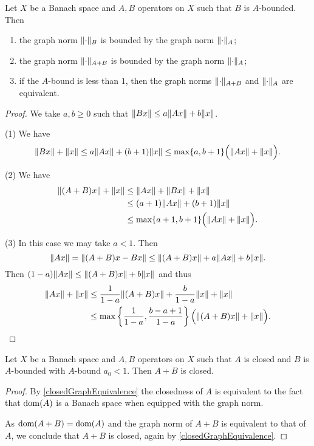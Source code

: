 \begin{lemma}
Let $X$ be a Banach space and $A,B$ operators on $X$ such that $B$ is $A$-bounded. Then
\begin{enumerate}
\item the graph norm $\lVert\cdot\rVert_B$ is bounded by the graph norm $\lVert\cdot\rVert_{A}$;
\item the graph norm $\lVert\cdot\rVert_{A+B}$ is bounded by the graph norm $\lVert\cdot\rVert_{A}$;
\item if the $A$-bound is less than $1$, then the graph norms $\lVert\cdot\rVert_{A+B}$ and $\lVert\cdot\rVert_{A}$ are equivalent.
\end{enumerate}
\end{lemma}
\begin{proof}
We take $a,b\geq 0$ such that $\lVert Bx\rVert \leq a\lVert Ax\rVert + b\lVert x\rVert$.

(1) We have
\[ \lVert Bx\rVert+\lVert x\rVert \leq a\lVert Ax\rVert + (b+1)\lVert x\rVert \leq \max\{a,b+1\}\Big(\lVert Ax\rVert +\lVert x\rVert\Big). \]

(2) We have
\begin{align*}
\lVert(A+B)x\rVert + \lVert x\rVert &\leq \lVert Ax\rVert +\lVert Bx\rVert +\lVert x\rVert \\
&\leq (a+1)\lVert Ax\rVert + (b+1)\lVert x\rVert \\
&\leq \max\{a+1, b+1\}\Big(\lVert Ax\rVert +\lVert x\rVert\Big).
\end{align*}

(3) In this case we may take $a < 1$. Then
\[ \lVert Ax\rVert = \lVert(A+B)x - Bx\rVert \leq \lVert(A+B)x\rVert + a\lVert Ax\rVert +b\lVert x\rVert. \]
Then $(1-a)\lVert Ax\rVert\leq \lVert(A+B)x\rVert +b\lVert x\rVert$ and thus
\begin{align*}
\lVert Ax\rVert + \lVert x\rVert &\leq \frac{1}{1-a}\lVert(A+B)x\rVert + \frac{b}{1-a}\lVert x\rVert + \lVert x\rVert \\
&\leq \max\left\{\frac{1}{1-a}, \frac{b-a+1}{1-a}\right\}\Big(\lVert(A+B)x\rVert +\lVert x\rVert\Big).
\end{align*}
\end{proof}
\begin{corollary}
Let $X$ be a Banach space and $A,B$ operators on $X$ such that $A$ is closed and $B$ is $A$-bounded with $A$-bound $a_0<1$. Then $A+B$ is closed.
\end{corollary}
\begin{proof}
By \ref{closedGraphEquivalence} the closedness of $A$ is equivalent to the fact that $\operatorname{dom}(A)$ is a Banach space when equipped with the graph norm.

As $\operatorname{dom}(A+B) = \operatorname{dom}(A)$ and the graph norm of $A+B$ is equivalent to that of $A$, we conclude that $A+B$ is closed, again by \ref{closedGraphEquivalence}.
\end{proof}

